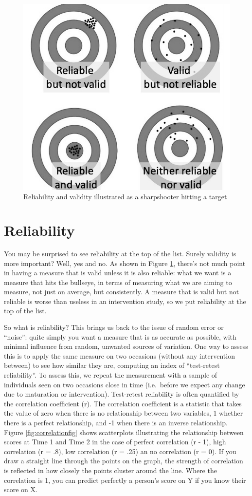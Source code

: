 \documentclass{krantz}
\begin{document}
 

\begin{figure}
\includegraphics[width=0.5\linewidth]{images_bw/targets} \caption{Reliability and validity illustrated as a sharpshooter hitting a target}\label{fig:darts}
\end{figure}

\hypertarget{reliability-1}{%
\section{Reliability}\label{reliability-1}}

You may be surprised to see reliability at the top of the list. Surely validity is more important? Well, yes and no. As shown in Figure \ref{fig:darts}, there's not much point in having a measure that is valid unless it is also reliable: what we want is a measure that hits the bullseye, in terms of measuring what we are aiming to measure, not just on average, but consistently. A measure that is valid but not reliable is worse than useless in an intervention study, so we put reliability at the top of the list.

So what is reliability? This brings us back to the issue of random error or ``noise'': quite simply you want a measure that is as accurate as possible, with minimal influence from random, unwanted sources of variation. One way to assess this is to apply the same measure on two occasions (without any intervention between) to see how similar they are, computing an index of ``test-retest reliability''. To assess this, we repeat the measurement with a sample of individuals seen on two occasions close in time (i.e.~before we expect any change due to maturation or intervention). Test-retest reliability is often quantified by the correlation coefficient (r). The correlation coefficient is a statistic that takes the value of zero when there is no relationship between two variables, 1 whether there is a perfect relationship, and -1 when there is an inverse relationship. Figure \ref{fig:correlationfig} shows scatterplots illustrating the relationship between scores at Time 1 and Time 2 in the case of perfect correlation (r - 1), high correlation (r = .8), low correlation (r = .25) an no correlation (r = 0). If you draw a straight line through the points on the graph, the strength of correlation is reflected in how closely the points cluster around the line. Where the correlation is 1, you can predict perfectly a person's score on Y if you know their score on X.
\end{document}
